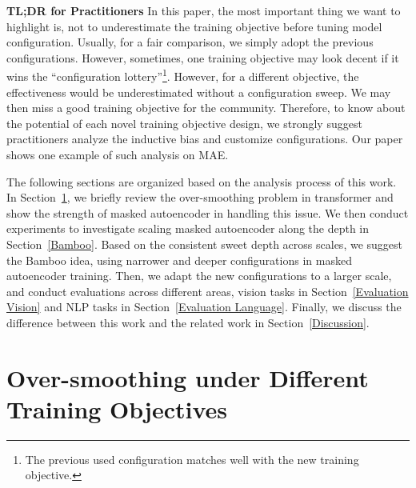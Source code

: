 \documentclass{article}
\theoremstyle{plain}
\theoremstyle{definition}
\theoremstyle{remark}
\begin{document}
\textbf{TL;DR for Practitioners} In this paper, the most important thing we want to highlight is, not to underestimate the training objective before tuning model configuration. Usually, for a fair comparison, we simply adopt the previous configurations. However, sometimes, one training objective may look decent if it wins the ``configuration lottery''\footnote{The previous used configuration matches well with the new training objective.}. However, for a different objective, the effectiveness would be underestimated without a configuration sweep. We may then miss a good training objective for the community. Therefore, to know about the potential of each novel training objective design, we strongly suggest practitioners analyze the inductive bias and customize configurations. Our paper shows one example of such analysis on MAE.



The following sections are organized based on the analysis process of this work. In Section~\ref{over-smoothing in Masked Autoencoder}, we briefly review the over-smoothing problem in transformer and show the strength of masked autoencoder in handling this issue. We then conduct experiments to investigate scaling masked autoencoder along the depth in Section~\ref{Bamboo}. Based on the consistent sweet depth across scales, we suggest the Bamboo idea, using narrower and deeper configurations in masked autoencoder training. Then, we adapt the new configurations to a larger scale, and conduct evaluations across different areas, vision tasks in Section~\ref{Evaluation Vision} and NLP tasks in Section~\ref{Evaluation Language}. Finally, we discuss the difference between this work and the related work in Section~\ref{Discussion}.



















\section{Over-smoothing under Different Training Objectives}\label{over-smoothing in Masked Autoencoder}
\end{document}
